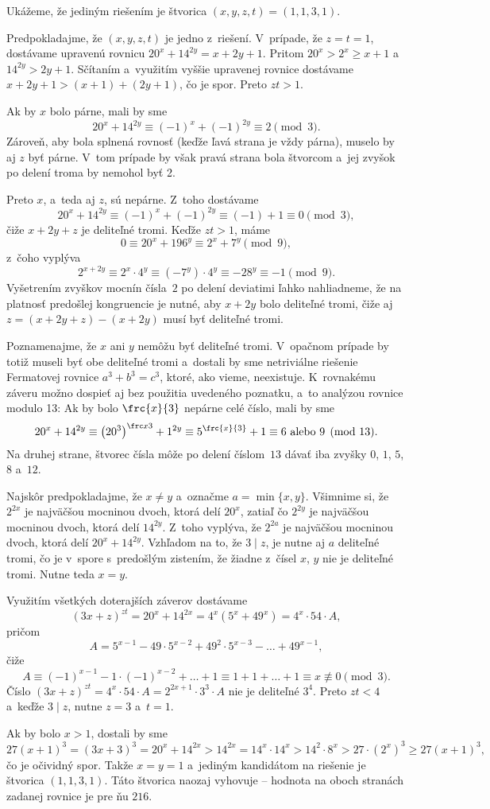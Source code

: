 {%
Ukážeme, že jediným riešením je štvorica $(x,y,z,t)=(1,1,3,1)$.

Predpokladajme, že $(x,y,z,t)$ je jedno z~riešení. V~prípade, že $z=t=1$, dostávame upravenú rovnicu $20^x+14^{2y}=x+2y+1$. Pritom $20^x>2^x\ge x+1$ a~$14^{2y}>2y+1$. Sčítaním a~využitím vyššie upravenej rovnice dostávame $x+2y+1> (x+1)+(2y+1)$, čo je spor. Preto $zt>1$.

Ak by $x$ bolo párne, mali by sme
$$
20^x+14^{2y}\equiv (-1)^x+(-1)^{2y}\equiv 2\pmod{3}.
$$
Zároveň, aby bola splnená rovnosť (keďže ľavá strana je vždy párna), muselo by aj $z$ byť párne. V~tom prípade by však pravá strana bola štvorcom a~jej zvyšok po delení troma by nemohol byť 2.

Preto $x$, a~teda aj $z$, sú nepárne. Z~toho dostávame
$$
20^x+14^{2y}\equiv (-1)^x+(-1)^{2y}\equiv (-1)+1\equiv 0\pmod{3},
$$
čiže $x+2y+z$ je deliteľné tromi. Keďže $zt>1$, máme
$$
0\equiv 20^x+196^{y}\equiv 2^x+7^{y}\pmod{9},
$$
z~čoho vyplýva
$$
2^{x+2y}\equiv 2^x\cdot4^y\equiv(-7^y)\cdot4^y\equiv -28^y\equiv -1\pmod{9}.
$$
Vyšetrením zvyškov mocnín čísla~$2$ po delení deviatimi ľahko nahliadneme, že na platnosť predošlej kongruencie je nutné, aby $x+2y$ bolo deliteľné tromi, čiže aj $z=(x+2y+z)-(x+2y)$ musí byť deliteľné tromi.

Poznamenajme, že $x$ ani $y$ nemôžu byť deliteľné tromi. V~opačnom prípade by totiž museli byť obe deliteľné tromi a~dostali by sme netriviálne riešenie Fermatovej rovnice $a^3+b^3=c^3$, ktoré, ako vieme, neexistuje. K~rovnakému záveru možno dospieť aj bez použitia uvedeného poznatku, a~to analýzou rovnice modulo 13: Ak by bolo $\frc{x}{3}$ nepárne celé číslo, mali by sme
$$
20^x+14^{2y}\equiv \left(20^3\right)^{\frc x3}+1^{2y}\equiv 5^{\frc{x}{3}}+1\equiv 6\ \text{alebo} \ 9\pmod{13}.
$$
Na druhej strane, štvorec čísla môže po delení číslom~$13$ dávať iba zvyšky $0$, $1$, $5$, $8$ a~$12$.

Najskôr predpokladajme, že $x\ne y$ a~označme $a=\min\{x,y\}$. Všimnime si, že $2^{2x}$ je najväčšou mocninou dvoch, ktorá delí $20^x$, zatiaľ čo $2^{2y}$ je najväčšou mocninou dvoch, ktorá delí $14^{2y}$. Z~toho vyplýva, že $2^{2a}$ je najväčšou mocninou dvoch, ktorá delí $20^x+14^{2y}$. Vzhľadom na to, že $3\mid z$, je nutne aj $a$ deliteľné tromi, čo je v~spore s~predošlým zistením, že žiadne z~čísel $x$, $y$ nie je deliteľné tromi. Nutne teda $x=y$.

Využitím všetkých doterajších záverov dostávame
$$
(3x+z)^{zt}=20^x+14^{2x}=4^x(5^x+49^x)=4^x\cdot54\cdot A,
$$
pričom
$$
A= 5^{x-1}-49\cdot5^{x-2}+49^2\cdot5^{x-3}-\dots+49^{x-1},
$$
čiže
$$
A\equiv(-1)^{x-1}-1\cdot(-1)^{x-2}+\dots+1\equiv1+1+\dots+1\equiv x\not\equiv 0\pmod{3}.
$$
Číslo $(3x+z)^{zt}=4^x\cdot54\cdot A=2^{2x+1}\cdot3^3\cdot A$ nie je deliteľné $3^4$. Preto $zt<4$ a~keďže $3\mid z$, nutne $z=3$ a~$t=1$.

Ak by bolo $x>1$, dostali by sme
$$
27(x+1)^3=(3x+3)^3=20^x+14^{2x}>14^{2x}=14^x\cdot14^x>14^2\cdot8^x>27\cdot(2^x)^3\ge27(x+1)^3,
$$
čo je očividný spor. Takže $x=y=1$ a~jediným kandidátom na riešenie je štvorica $(1,1,3,1)$. Táto štvorica naozaj vyhovuje -- hodnota na oboch stranách zadanej rovnice je pre ňu $216$.} 